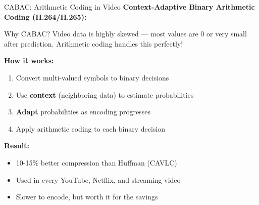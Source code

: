 \documentclass[aspectratio=169,12pt]{beamer}
\begin{document}
\begin{frame}{CABAC: Arithmetic Coding in Video}
    \textbf{Context-Adaptive Binary Arithmetic Coding (H.264/H.265):}
    
    \vspace{0.3cm}
    \begin{block}{Why CABAC?}
        Video data is highly skewed --- most values are 0 or very small after prediction. Arithmetic coding handles this perfectly!
    \end{block}
    
    \vspace{0.3cm}
    \textbf{How it works:}
    \begin{enumerate}
        \item Convert multi-valued symbols to binary decisions
        \item Use \textbf{context} (neighboring data) to estimate probabilities
        \item \textbf{Adapt} probabilities as encoding progresses
        \item Apply arithmetic coding to each binary decision
    \end{enumerate}
    
    \vspace{0.3cm}
    \textbf{Result:}
    \begin{itemize}
        \item 10-15\% better compression than Huffman (CAVLC)
        \item Used in every YouTube, Netflix, and streaming video
        \item Slower to encode, but worth it for the savings
    \end{itemize}
\end{frame}
\end{document}

